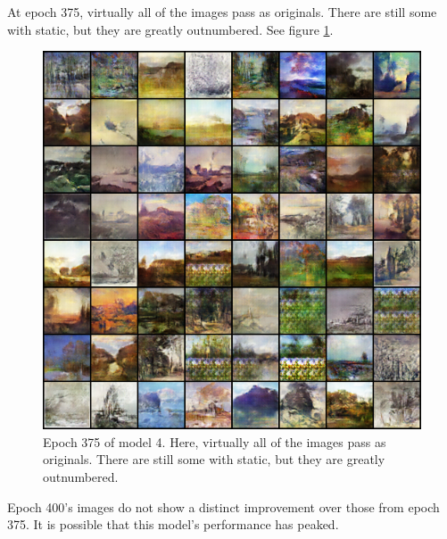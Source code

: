 \documentclass[11pt,letterpaper]{article}
\begin{document}
				At epoch 375, virtually all of the images pass as originals.
				There are still some with static, but they are greatly outnumbered.
				See figure \ref{fig:wa64:epoch375generator}.
				\begin{figure}
					\centering
					\includegraphics[width=1.0\linewidth]{results/model4/epoch375_generator}
					\caption{Epoch 375 of model 4. Here, virtually all of the images pass as originals. There are still some with static, but they are greatly outnumbered.}
					\label{fig:wa64:epoch375generator}
				\end{figure}

				Epoch 400's images do not show a distinct improvement over those from epoch 375.
				It is possible that this model's performance has peaked.
\end{document}
